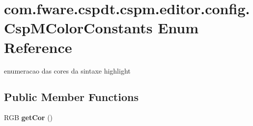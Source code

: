\hypertarget{enumcom_1_1fware_1_1cspdt_1_1cspm_1_1editor_1_1config_1_1_csp_m_color_constants}{}\section{com.\+fware.\+cspdt.\+cspm.\+editor.\+config.\+Csp\+M\+Color\+Constants Enum Reference}
\label{enumcom_1_1fware_1_1cspdt_1_1cspm_1_1editor_1_1config_1_1_csp_m_color_constants}


enumeracao das cores da sintaxe highlight  


\subsection*{Public Member Functions}
\begin{DoxyCompactItemize}
\item 
\mbox{\label{enumcom_1_1fware_1_1cspdt_1_1cspm_1_1editor_1_1config_1_1_csp_m_color_constants_a9dd861ecdbc4bc24673660cc91dfa422}} 
R\+GB {\bfseries get\+Cor} ()
\end{DoxyCompactItemize}
